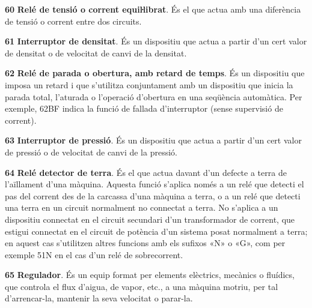 \begin{multicols}{2}
\begin{list}{}
\item[\textbf{60}]   
\textbf{Relé de tensió o corrent equiŀlibrat}. És el que actua amb una diferència de tensió o
corrent entre dos circuits.

\item[\textbf{61}] 
 \textbf{Interruptor de densitat}. És un dispositiu que actua a partir d'un cert valor de densitat o de velocitat de canvi de la densitat.


\item[\textbf{62}]   
\textbf{Relé de parada o obertura, amb retard de temps}. És un dispositiu que imposa un retard i que s'utilitza
conjuntament amb un dispositiu que inicia la parada total, l'aturada o l'operació
d'obertura en una seqüència automàtica. Per exemple, 62BF indica la funció de fallada d'interruptor (sense supervisió de corrent).

\item[\textbf{63}]   
\textbf{Interruptor de pressió}. És un dispositiu que actua a partir d'un cert valor de pressió o de velocitat de canvi de la pressió.

\item[\textbf{64}]    
\textbf{Relé detector de terra}.
És el que actua davant d'un defecte a terra de l'aïllament d'una
màquina. Aquesta funció s'aplica només a un relé que detecti el pas
del corrent des de la carcassa  d'una màquina a terra, o a un relé
que detecti una terra en un circuit normalment no connectat a terra. No
 s'aplica a un dispositiu connectat en el circuit secundari d'un
transformador de corrent, que estigui connectat en el circuit de
potència d'un sistema posat normalment a terra; en aquest cas s'utilitzen altres funcions amb els sufixos «N» o «G», com  per exemple 51N en el cas d'un relé de sobrecorrent.

\item[\textbf{65}]   
\textbf{Regulador}. És un equip format per elements
elèctrics, mecànics o fluídics,  que controla el flux d'aigua, de
vapor, etc.,  a una màquina motriu, per tal d'arrencar-la, mantenir
la seva velocitat o parar-la.


\end{list}
\end{multicols}
